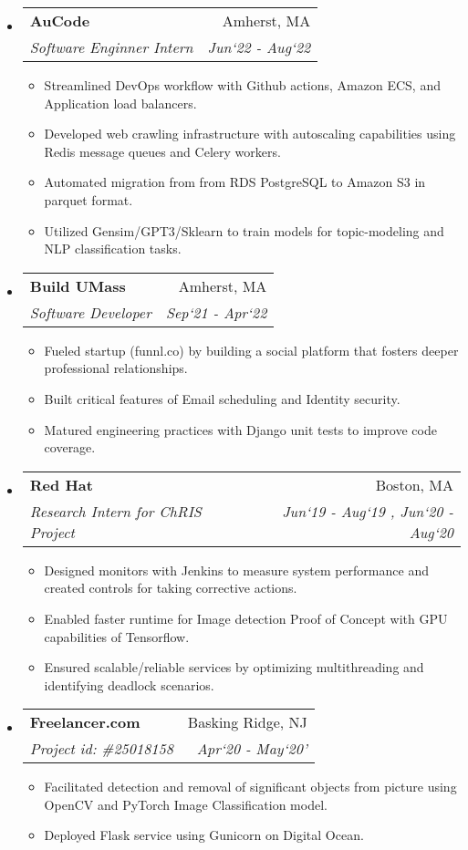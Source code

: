 \documentclass[letterpaper,8pt]{article}
\makeatletter
\newcommand{\resitem}[1]{\item #1 \vspace{-1pt}}
\newcommand{\resheading}[1]{{\normalsize \parashade[.9]{sharpcorners}{\textbf{#1 \vphantom{p\^{E}}}}}}
\newcommand{\ressubheading}[4]{
\begin{tabular*}{6.5in}{l@{\extracolsep{\fill}}r}
		\textbf{#1} & #2 \\
		\textit{#3} & \textit{#4} \\
\end{tabular*}\vspace{-4pt}}
\makeatother
\begin{document}
\resheading{Work Experience}
\begin{itemize}
\item
	\ressubheading{AuCode}{Amherst, MA}{Software Enginner Intern}{Jun`22 - Aug`22}
	\begin{itemize}
		\resitem{Streamlined DevOps workflow with Github actions, Amazon ECS, and Application load balancers.}
		\resitem{Developed web crawling infrastructure with autoscaling capabilities using Redis message queues and Celery workers.}
		\resitem{Automated migration from from RDS PostgreSQL to Amazon S3 in parquet format.}
		\resitem{Utilized Gensim/GPT3/Sklearn to train models for topic-modeling and NLP classification tasks.}
	\end{itemize}

\item
	\ressubheading{Build UMass}{Amherst, MA}{Software Developer}{Sep`21 - Apr`22}
	\begin{itemize}
		\resitem{Fueled startup (funnl.co) by building a social platform that fosters deeper professional relationships.}
		\resitem{Built critical features of Email scheduling and Identity security.}
		\resitem{Matured engineering practices with Django unit tests to improve code coverage.}
	\end{itemize}

\item 
	\ressubheading{Red Hat}{Boston, MA}{Research Intern for ChRIS Project}{Jun`19 - Aug`19 , Jun`20 - Aug`20}
	\begin{itemize}
		\resitem{Designed monitors with Jenkins to measure system performance and created controls for taking corrective actions.}
		\resitem{Enabled faster runtime for Image detection Proof of Concept with GPU capabilities of Tensorflow.}
		\resitem{Ensured scalable/reliable services by optimizing multithreading and identifying deadlock scenarios.}
	\end{itemize}

\item
	\ressubheading{Freelancer.com}{Basking Ridge, NJ}{Project id: \#25018158}{Apr`20 - May`20'}
	\begin{itemize}
		\resitem{Facilitated detection and removal of significant objects from picture using OpenCV and PyTorch Image Classification model.}
		\resitem{Deployed Flask service using Gunicorn on Digital Ocean.}
	\end{itemize}

\end{itemize}
\end{document}

